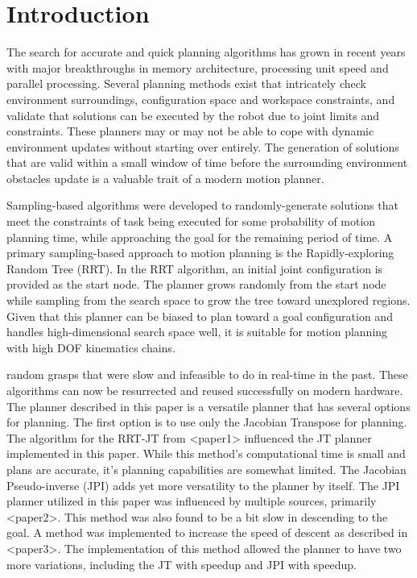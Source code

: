\documentclass[conference]{IEEEtran} \usepackage[T1]{fontenc} \usepackage[backend=biber, style=ieee]{biblatex}
\begin{document}
\section{Introduction} \label{Introduction}

The search for accurate and quick planning algorithms has grown in recent years with major breakthroughs in memory architecture, processing unit speed and 
parallel processing. Several planning methods exist that intricately check environment surroundings, configuration space and workspace constraints, and validate
that solutions can be executed by the robot due to joint limits and constraints. These planners may or may not be able to cope with dynamic environment updates
without starting over entirely. The generation of solutions that are valid within a small window of time before the surrounding environment obstacles update
is a valuable trait of a modern motion planner.

Sampling-based algorithms were developed to randomly-generate solutions that meet the constraints of task being executed for some probability of motion planning time, while 
approaching the goal for the remaining period of time. A primary sampling-based approach to motion planning is the Rapidly-exploring Random Tree (RRT). In the RRT algorithm,
an initial joint configuration is provided as the start node. The planner grows randomly from the start node while sampling from the search space to grow the tree toward
unexplored regions. Given that this planner can be biased to plan toward a goal configuration and handles high-dimensional search space well, it is suitable for motion
planning with high DOF kinematics chains.


random grasps that were slow and infeasible to do in real-time in the past. These algorithms can now be resurrected and 
reused successfully on modern hardware. The planner described in this paper is a versatile planner that has several options for planning. The first option is to 
use only the Jacobian Transpose for planning. The algorithm for the RRT-JT from <paper1> influenced the JT planner implemented in this paper.  While this 
method's computational time is small and plans are accurate, it's planning capabilities are somewhat limited. The Jacobian Pseudo-inverse (JPI) adds yet more 
versatility to the planner by itself. The JPI planner utilized in this paper was influenced by multiple sources, primarily <paper2>. This method was also found 
to be a bit slow in descending to the goal. A method was implemented to increase the speed of descent as described in <paper3>. The implementation of this method 
allowed the planner to have two more variations, including the JT with speedup and JPI with speedup. 
\end{document}
